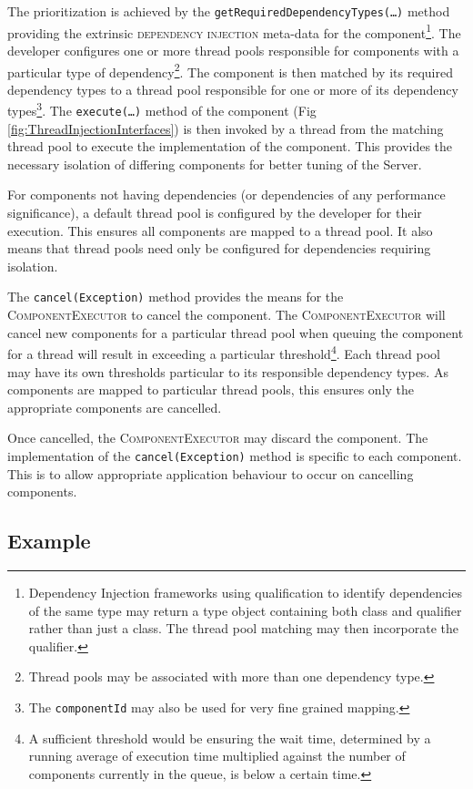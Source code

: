 \documentclass[prodmode]{style/acmlarge}
\begin{document}
The prioritization is achieved by the
\texttt{getRequiredDependencyTypes(\ldots)} method providing the extrinsic
\textsc{dependency injection} \cite{ioc} meta-data for the
component\footnote{Dependency Injection frameworks using qualification to
identify dependencies of the same type may return a type object containing both
class and qualifier rather than just a class.  The thread pool matching may then
incorporate the qualifier.}.  The developer configures one or more thread pools
responsible for components with a particular type of dependency\footnote{Thread
pools may be associated with more than one dependency type.}.  The component is
then matched by its required dependency types to a thread pool responsible for
one or more of its dependency types\footnote{The \texttt{componentId} may also
be used for very fine grained mapping.}.  The \texttt{execute(\ldots)} method of
the component (Fig \ref{fig:ThreadInjectionInterfaces}) is then invoked by a thread
from the matching thread pool to execute the implementation of the component.
This provides the necessary isolation of differing components for better tuning
of the Server.

For components not having dependencies (or dependencies of any
performance significance), a default thread pool is configured by the developer
for their execution.  This ensures all components are mapped to a
thread pool.  It also means that thread pools need only be configured for
dependencies requiring isolation.

The \texttt{cancel(Exception)} method provides the means for the
\textsc{ComponentExecutor} to cancel the component.  The
\textsc{ComponentExecutor} will cancel new components for a particular thread
pool when queuing the component for a thread will result in exceeding a
particular threshold\footnote{A sufficient threshold would be ensuring the wait
time, determined by a running average of execution time multiplied against the
number of components currently in the queue, is below a certain time.}.  Each
thread pool may have its own thresholds particular to its responsible dependency
types.  As components are mapped to particular thread pools, this ensures only
the appropriate components are cancelled.

Once cancelled, the \textsc{ComponentExecutor} may discard the component.  The
implementation of the \texttt{cancel(Exception)} method is specific to each
component.  This is to allow appropriate application behaviour to occur on
cancelling components.


\subsection{Example}
\end{document}
